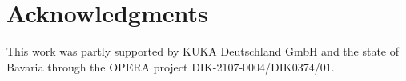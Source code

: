 \section{Acknowledgments}
\noindent This work was partly supported by KUKA Deutschland GmbH
and the state of Bavaria through the OPERA project DIK-2107-0004/DIK0374/01.